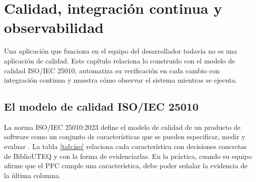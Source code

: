 \chapter{Calidad, integración continua y observabilidad}\label{cap:calidad}

Una aplicación que funciona en el equipo del desarrollador todavía no es una aplicación de calidad. Este capítulo relaciona lo construido con el modelo de calidad ISO/IEC 25010, automatiza su verificación en cada cambio con integración continua y muestra cómo observar el sistema mientras se ejecuta.

\section{El modelo de calidad ISO/IEC 25010}

La norma ISO/IEC 25010:2023 define el modelo de calidad de un producto de software como un conjunto de características que se pueden especificar, medir y evaluar \cite{iso25010_2023}. La tabla \ref{tab:iso} relaciona cada característica con decisiones concretas de BiblioUTEQ y con la forma de evidenciarlas. En la práctica, cuando su equipo afirme que el PFC cumple una característica, debe poder señalar la evidencia de la última columna.

